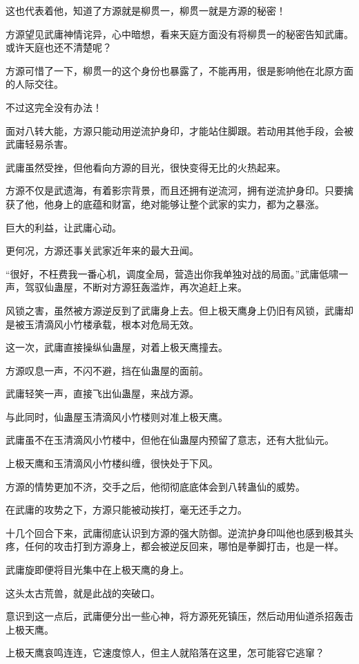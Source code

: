 \begin{this_body}
这也代表着他，知道了方源就是柳贯一，柳贯一就是方源的秘密！

方源望见武庸神情诧异，心中暗想，看来天庭方面没有将柳贯一的秘密告知武庸。或许天庭也还不清楚呢？

方源可惜了一下，柳贯一的这个身份也暴露了，不能再用，很是影响他在北原方面的人际交往。

不过这完全没有办法！

面对八转大能，方源只能动用逆流护身印，才能站住脚跟。若动用其他手段，会被武庸轻易杀害。

武庸虽然受挫，但他看向方源的目光，很快变得无比的火热起来。

方源不仅是武遗海，有着影宗背景，而且还拥有逆流河，拥有逆流护身印。只要擒获了他，他身上的底蕴和财富，绝对能够让整个武家的实力，都为之暴涨。

巨大的利益，让武庸心动。

更何况，方源还事关武家近年来的最大丑闻。

“很好，不枉费我一番心机，调度全局，营造出你我单独对战的局面。”武庸低啸一声，驾驭仙蛊屋，不断对方源狂轰滥炸，再次追赶上来。

风锁之害，虽然被方源逆反到了武庸身上去。但上极天鹰身上仍旧有风锁，武庸却是被玉清滴风小竹楼承载，根本对危局无效。

这一次，武庸直接操纵仙蛊屋，对着上极天鹰撞去。

方源叹息一声，不闪不避，挡在仙蛊屋的面前。

武庸轻笑一声，直接飞出仙蛊屋，来战方源。

与此同时，仙蛊屋玉清滴风小竹楼则对准上极天鹰。

武庸虽不在玉清滴风小竹楼中，但他在仙蛊屋内预留了意志，还有大批仙元。

上极天鹰和玉清滴风小竹楼纠缠，很快处于下风。

方源的情势更加不济，交手之后，他彻彻底底体会到八转蛊仙的威势。

在武庸的攻势之下，方源只能被动挨打，毫无还手之力。

十几个回合下来，武庸彻底认识到方源的强大防御。逆流护身印叫他也感到极其头疼，任何的攻击打到方源身上，都会被逆反回来，哪怕是拳脚打击，也是一样。

武庸旋即便将目光集中在上极天鹰的身上。

这头太古荒兽，就是此战的突破口。

意识到这一点后，武庸便分出一些心神，将方源死死镇压，然后动用仙道杀招轰击上极天鹰。

上极天鹰哀鸣连连，它速度惊人，但主人就陷落在这里，怎可能容它逃窜？


\end{this_body}
